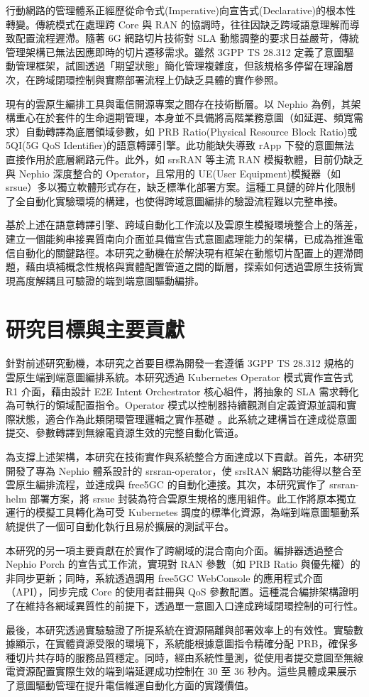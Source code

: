 行動網路的管理體系正經歷從命令式(Imperative)向宣告式(Declarative)的根本性轉變。傳統模式在處理跨 Core 與 RAN 的協調時，往往因缺乏跨域語意理解而導致配置流程遲滯。隨著 6G 網路切片技術對 SLA 動態調整的要求日益嚴苛，傳統管理架構已無法因應即時的切片遷移需求。雖然 3GPP TS 28.312 定義了意圖驅動管理框架，試圖透過「期望狀態」簡化管理複雜度，但該規格多停留在理論層次，在跨域閉環控制與實際部署流程上仍缺乏具體的實作參照。

現有的雲原生編排工具與電信開源專案之間存在技術斷層。以 Nephio 為例，其架構重心在於套件的生命週期管理，本身並不具備將高階業務意圖（如延遲、頻寬需求）自動轉譯為底層領域參數，如 PRB Ratio(Physical Resource Block Ratio)或 5QI(5G QoS Identifier)的語意轉譯引擎。此功能缺失導致 rApp 下發的意圖無法直接作用於底層網路元件。此外，如 srsRAN 等主流 RAN 模擬軟體，目前仍缺乏與 Nephio 深度整合的 Operator，且常用的 UE(User Equipment)模擬器（如 srsue）多以獨立軟體形式存在，缺乏標準化部署方案。這種工具鏈的碎片化限制了全自動化實驗環境的構建，也使得跨域意圖編排的驗證流程難以完整串接。

基於上述在語意轉譯引擎、跨域自動化工作流以及雲原生模擬環境整合上的落差，建立一個能夠串接異質南向介面並具備宣告式意圖處理能力的架構，已成為推進電信自動化的關鍵路徑。本研究之動機在於解決現有框架在動態切片配置上的遲滯問題，藉由填補概念性規格與實體配置管道之間的斷層，探索如何透過雲原生技術實現高度解耦且可驗證的端到端意圖驅動編排。

\section{研究目標與主要貢獻}

針對前述研究動機，本研究之首要目標為開發一套遵循 3GPP TS 28.312 規格的雲原生端到端意圖編排系統。本研究透過 Kubernetes Operator 模式實作宣告式 R1 介面，藉由設計 E2E Intent Orchestrator 核心組件，將抽象的 SLA 需求轉化為可執行的領域配置指令。Operator 模式以控制器持續觀測自定義資源並調和實際狀態，適合作為此類閉環管理邏輯之實作基礎 \cite{kubernetes_operator_pattern,kubernetes_controller}。此系統之建構旨在達成從意圖提交、參數轉譯到無線電資源生效的完整自動化管道。

為支撐上述架構，本研究在技術實作與系統整合方面達成以下貢獻。首先，本研究開發了專為 Nephio 體系設計的 srsran-operator，使 srsRAN 網路功能得以整合至雲原生編排流程，並達成與 free5GC 的自動化連接。其次，本研究實作了 srsran-helm 部署方案，將 srsue 封裝為符合雲原生規格的應用組件。此工作將原本獨立運行的模擬工具轉化為可受 Kubernetes 調度的標準化資源，為端到端意圖驅動系統提供了一個可自動化執行且易於擴展的測試平台。

本研究的另一項主要貢獻在於實作了跨網域的混合南向介面。編排器透過整合 Nephio Porch 的宣告式工作流，實現對 RAN 參數（如 PRB Ratio 與優先權）的非同步更新；同時，系統透過調用 free5GC WebConsole 的應用程式介面（API），同步完成 Core 的使用者註冊與 QoS 參數配置。這種混合編排架構證明了在維持各網域異質性的前提下，透過單一意圖入口達成跨域閉環控制的可行性。

最後，本研究透過實驗驗證了所提系統在資源隔離與部署效率上的有效性。實驗數據顯示，在實體資源受限的環境下，系統能根據意圖指令精確分配 PRB，確保多種切片共存時的服務品質穩定。同時，經由系統性量測，從使用者提交意圖至無線電資源配置實際生效的端到端延遲成功控制在 30 至 36 秒內。這些具體成果展示了意圖驅動管理在提升電信維運自動化方面的實踐價值。
